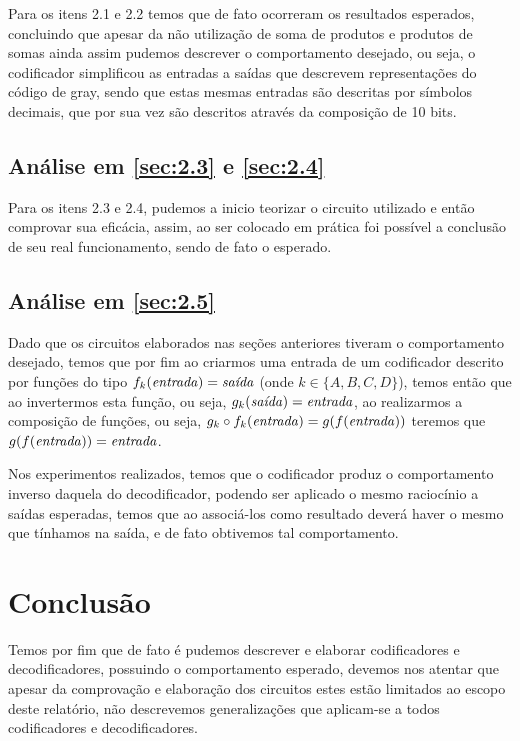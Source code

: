 \documentclass[12pt]{article}
\begin{document}
Para os itens 2.1 e 2.2 temos que de fato ocorreram os resultados esperados,
concluindo que apesar da não utilização de soma de produtos e produtos de somas
ainda assim pudemos descrever o comportamento desejado, ou seja, o codificador
simplificou as entradas a saídas que descrevem representações do código de gray,
sendo que estas mesmas entradas são descritas por símbolos decimais, que por sua
vez são descritos através da composição de 10 bits.

\subsection{Análise em \ref{sec:2.3} e \ref{sec:2.4}}\label{sec:analise2.4}

Para os itens 2.3 e 2.4, pudemos a inicio teorizar o circuito utilizado e então
comprovar sua eficácia, assim, ao ser colocado em prática foi possível a
conclusão de seu real funcionamento, sendo de fato o esperado.

\subsection{Análise em \ref{sec:2.5}}\label{sec:analise2.5}

Dado que os circuitos elaborados nas seções anteriores tiveram o comportamento
desejado, temos que por fim ao criarmos uma entrada de um codificador descrito
por funções do tipo $f_{k}(\text{\emph{entrada}}) = \text{\emph{saída}}$ (onde
$k \in \{A,B,C,D\}$), temos então que ao invertermos esta função, ou seja,
$g_{k}(\text{\emph{saída}}) = \text{\emph{entrada}}$, ao realizarmos a
composição de funções, ou seja,
$g_{k} \circ f_{k}(\text{\emph{entrada}}) = g(f(\text{\emph{entrada}}))$ teremos
que $g(f(\text{\emph{entrada}})) = \text{\emph{entrada}}$.

Nos experimentos realizados, temos que o codificador produz o comportamento
inverso daquela do decodificador, podendo ser aplicado o mesmo raciocínio a
saídas esperadas, temos que ao associá-los como resultado deverá haver o mesmo
que tínhamos na saída, e de fato obtivemos tal comportamento.

\section{Conclusão}
\label{sec:Conclusao}

Temos por fim que de fato é pudemos descrever e elaborar codificadores e
decodificadores, possuindo o comportamento esperado, devemos nos atentar que
apesar da comprovação e elaboração dos circuitos estes estão limitados ao escopo
deste relatório, não descrevemos generalizações que aplicam-se a todos
codificadores e decodificadores.
\end{document}
